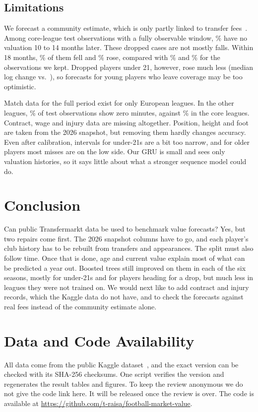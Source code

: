 \documentclass[conference]{IEEEtran}
\begin{document}
\subsection{Limitations}\label{sec:limits}
We forecast a community estimate, which is only partly linked to transfer fees~\cite{coates2022wisdom}. Among core-league test observations with a fully observable window, \DropRateTest\% have no valuation 10 to 14 months later. These dropped cases are not mostly falls. Within 18 months, \DropFell\% of them fell and \DropRose\% rose, compared with \KeptFell\% and \KeptRose\% for the observations we kept. Dropped players under 21, however, rose much less (median log change \DropYoungMedian{} vs.\ \KeptYoungMedian), so forecasts for young players who leave coverage may be too optimistic.

Match data for the full period exist for only \NCoreLeagues{} European leagues. In the other \NNewLeagues{} leagues, \NewZeroMin\% of test observations show zero minutes, against \CoreZeroMin\% in the core leagues. Contract, wage and injury data are missing altogether. Position, height and foot are taken from the 2026 snapshot, but removing them hardly changes accuracy. Even after calibration, intervals for under-21s are a bit too narrow, and for older players most misses are on the low side. Our GRU is small and sees only valuation histories, so it says little about what a stronger sequence model could do.

\section{Conclusion}
Can public Transfermarkt data be used to benchmark value forecasts? Yes, but two repairs come first. The 2026 snapshot columns have to go, and each player's club history has to be rebuilt from transfers and appearances. The split must also follow time. Once that is done, age and current value explain most of what can be predicted a year out. Boosted trees still improved on them in each of the six seasons, mostly for under-21s and for players heading for a drop, but much less in leagues they were not trained on. We would next like to add contract and injury records, which the Kaggle data do not have, and to check the forecasts against real fees instead of the community estimate alone.

\section*{Data and Code Availability}
All data come from the public Kaggle dataset~\cite{kaggle_transfermarkt}, and the exact version can be checked with its SHA-256 checksums. One script verifies the version and regenerates the \NResultTables{} result tables and \NFigures{} figures. \ifanonymous
To keep the review anonymous we do not give the code link here. It will be released once the review is over.
\else
The code is available at \url{https://github.com/t-raisa/football-market-value}.
\fi

\ifanonymous{}\fi


\end{document}
